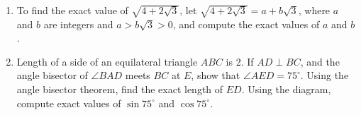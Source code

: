 \begin{question}
    \begin{enumerate}
        \item To find the exact value of $\sqrt{4 + 2\sqrt{3}}$, let $\sqrt{4 +
            2\sqrt{3}} = a + b\sqrt{3}$, where $a$ and $b$ are integers and $a
            > b\sqrt{3} > 0$, and compute the exact values of $a$ and $b$.

        \item Length of a side of an equilateral triangle $ABC$ is 2. If $AD
            \perp BC$, and the angle bisector of $\angle BAD$ meets $BC$ at
            $E$, show that $\angle AED = 75^\circ$. Using the angle bisector
            theorem, find the exact length of $ED$. Using the diagram, compute
            exact values of $\sin 75^\circ$ and $\cos 75^\circ$.
    \end{enumerate}
\end{question}
